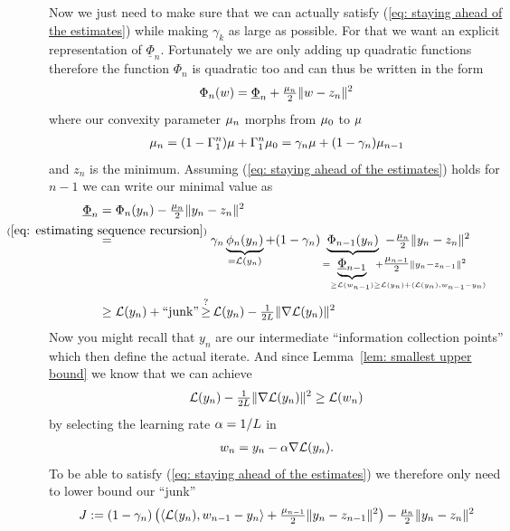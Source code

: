 Now we just need to make sure that we can actually satisfy (\ref{eq: staying
ahead of the estimates}) while making \(\gamma_k\) as large as possible.
For that we want an explicit representation of \(\underline{\Phi}_{n}\).
Fortunately we are only adding up quadratic functions therefore the function
\(\Phi_{n}\) is quadratic too and can thus be written in the form
\begin{align}\label{eq: centered Phi representation}
	\Phi_{n}(w) = \underline{\Phi}_{n} + \tfrac{\mu_{n}}{2}\|w - z_n\|^2
\end{align}
where our convexity parameter \(\mu_n\) morphs from \(\mu_0\) to
\(\mu\)
\begin{align}\label{eq: lbound recursion}
	\mu_n =(1-\Gamma_1^n)\mu + \Gamma_1^n \mu_0
	= \gamma_n \mu + (1-\gamma_n)\mu_{n-1}
\end{align}
and \(z_n\) is the minimum. Assuming (\ref{eq: staying ahead of the estimates})
holds for \(n-1\) we can write our minimal value as
\begin{align*}
	\underline{\Phi}_n
	&= \Phi_n(y_n) - \tfrac{\lbound_n}{2}\|y_n - z_n\|^2 \\
	&\lxeq{(\ref{eq: estimating sequence recursion})}
	\gamma_n \underbrace{\phi_n(y_n)}_{
		=\Loss(y_n)
	}
	+ (1-\gamma_n)\underbrace{\Phi_{n-1}(y_n)}_{
		= \underbrace{\underline{\Phi}_{n-1}}_{
			\ge \Loss(\weights_{n-1})
			\mathrlap{\ge \Loss(y_n) + \langle \Loss(y_n), \weights_{n-1} - y_n\rangle}
		} +\mathrlap{\tfrac{\lbound_{n-1}}{2}\|y_n - z_{n-1}\|^2}
	} - \tfrac{\lbound_n}{2}\|y_n - z_n\|^2 \\
	&\ge \Loss(y_n) + \text{``junk''}
	\xge{?} \Loss(y_n) - \tfrac{1}{2\ubound}\|\nabla\Loss(y_n)\|^2
\end{align*}
Now you might recall that \(y_n\) are our intermediate ``information
collection points'' which then define the actual iterate. And
since Lemma~\ref{lem: smallest upper bound} we know that we can achieve
\begin{align*}
	\mathcal{L}(y_n) - \tfrac{1}{2L}\|\nabla\mathcal{L}(y_n)\|^2
	\ge \mathcal{L}(w_n)
\end{align*}
by selecting the learning rate \(\alpha=1/L\) in
\begin{align*}
	w_n = y_n - \alpha \nabla\mathcal{L}(y_n).
\end{align*}
To be able to satisfy (\ref{eq: staying ahead of the estimates}) we therefore
only need to lower bound our ``junk''
\begin{align*}
	J := (1-\gamma_n)\left(
		\langle \mathcal{L}(y_n), w_{n-1} - y_n\rangle
		+ \tfrac{\mu_{n-1}}{2}\|y_n - z_{n-1}\|^2
	\right)
	- \tfrac{\mu_n}{2}\|y_n - z_n\|^2
\end{align*}
